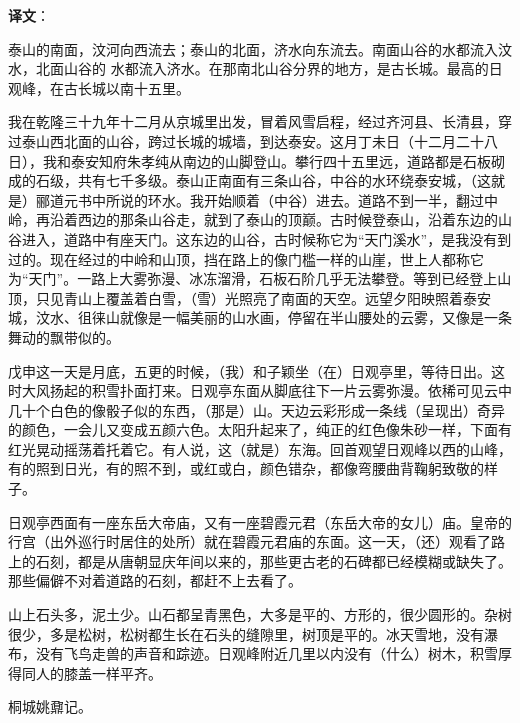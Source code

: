 \documentclass[12pt,UTF-8,openany]{ctexbook}
\begin{document}
\newpage

\textbf{译文}：

\vspace{1em}

\begin{normalsize}
    
    泰山的南面，汶河向西流去；泰山的北面，济水向东流去。南面山谷的水都流入汶水，北面山谷的 水都流入济水。在那南北山谷分界的地方，是古长城。最高的日观峰，在古长城以南十五里。
    
    我在乾隆三十九年十二月从京城里出发，冒着风雪启程，经过齐河县、长清县，穿过泰山西北面的山谷，跨过长城的城墙，到达泰安。这月丁未日（十二月二十八日），我和泰安知府朱孝纯从南边的山脚登山。攀行四十五里远，道路都是石板砌成的石级，共有七千多级。泰山正南面有三条山谷，中谷的水环绕泰安城，（这就是）郦道元书中所说的环水。我开始顺着（中谷）进去。道路不到一半，翻过中岭，再沿着西边的那条山谷走，就到了泰山的顶巅。古时候登泰山，沿着东边的山谷进入，道路中有座天门。这东边的山谷，古时候称它为“天门溪水”，是我没有到过的。现在经过的中岭和山顶，挡在路上的像门槛一样的山崖，世上人都称它为“天门”。一路上大雾弥漫、冰冻溜滑，石板石阶几乎无法攀登。等到已经登上山顶，只见青山上覆盖着白雪，（雪）光照亮了南面的天空。远望夕阳映照着泰安城，汶水、徂徕山就像是一幅美丽的山水画，停留在半山腰处的云雾，又像是一条舞动的飘带似的。
    
    戊申这一天是月底，五更的时候，（我）和子颖坐（在）日观亭里，等待日出。这时大风扬起的积雪扑面打来。日观亭东面从脚底往下一片云雾弥漫。依稀可见云中几十个白色的像骰子似的东西，（那是）山。天边云彩形成一条线（呈现出）奇异的颜色，一会儿又变成五颜六色。太阳升起来了，纯正的红色像朱砂一样，下面有红光晃动摇荡着托着它。有人说，这（就是）东海。回首观望日观峰以西的山峰，有的照到日光，有的照不到，或红或白，颜色错杂，都像弯腰曲背鞠躬致敬的样子。
    
    日观亭西面有一座东岳大帝庙，又有一座碧霞元君（东岳大帝的女儿）庙。皇帝的行宫（出外巡行时居住的处所）就在碧霞元君庙的东面。这一天，（还）观看了路上的石刻，都是从唐朝显庆年间以来的，那些更古老的石碑都已经模糊或缺失了。那些偏僻不对着道路的石刻，都赶不上去看了。
    
    山上石头多，泥土少。山石都呈青黑色，大多是平的、方形的，很少圆形的。杂树很少，多是松树，松树都生长在石头的缝隙里，树顶是平的。冰天雪地，没有瀑布，没有飞鸟走兽的声音和踪迹。日观峰附近几里以内没有（什么）树木，积雪厚得同人的膝盖一样平齐。
    
    桐城姚鼐记。
    
\end{normalsize}
\end{document}
